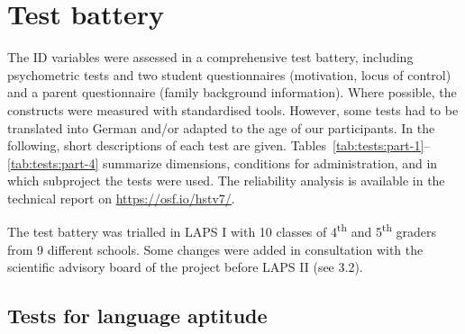 \documentclass[output=paper]{langsci/langscibook}
\begin{document}
\section{Test battery}

The ID variables were assessed in a comprehensive test battery, including psychometric tests and two student questionnaires (motivation, locus of control) and a parent questionnaire (family background information). Where possible, the constructs were measured with standardised tools. However, some tests had to be translated into German and/or adapted to the age of our participants. In the following, short descriptions of each test are given. Tables~\ref{tab:tests:part-1}--\ref{tab:tests:part-4} summarize dimensions, conditions for administration, and in which subproject the tests were used. The reliability analysis is available in the technical report on \url{https://osf.io/hstv7/}.

The test battery was trialled in LAPS I with 10 classes of 4\textsuperscript{th} and 5\textsuperscript{th} graders from 9 different schools. Some changes were added in consultation with the scientific advisory board of the project before LAPS II (see 3.2).

\subsection{Tests for language aptitude}
\end{document}
